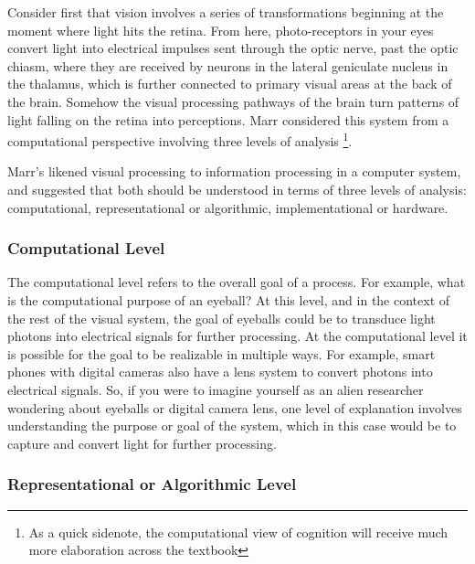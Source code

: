 \documentclass[
  oneside,
  12pt]{crumpbook}
\begin{document}
Consider first that vision involves a series of transformations beginning at the moment where light hits the retina. From here, photo-receptors in your eyes convert light into electrical impulses sent through the optic nerve, past the optic chiasm, where they are received by neurons in the lateral geniculate nucleus in the thalamus, which is further connected to primary visual areas at the back of the brain. Somehow the visual processing pathways of the brain turn patterns of light falling on the retina into perceptions. Marr considered this system from a computational perspective involving three levels of analysis \footnote{As a quick sidenote, the computational view of cognition will receive much more elaboration across the textbook}.

Marr's likened visual processing to information processing in a computer system, and suggested that both should be understood in terms of three levels of analysis: computational, representational or algorithmic, implementational or hardware.

\hypertarget{computational-level}{%
\subsubsection{Computational Level}\label{computational-level}}

The computational level refers to the overall goal of a process. For example, what is the computational purpose of an eyeball? At this level, and in the context of the rest of the visual system, the goal of eyeballs could be to transduce light photons into electrical signals for further processing. At the computational level it is possible for the goal to be realizable in multiple ways. For example, smart phones with digital cameras also have a lens system to convert photons into electrical signals. So, if you were to imagine yourself as an alien researcher wondering about eyeballs or digital camera lens, one level of explanation involves understanding the purpose or goal of the system, which in this case would be to capture and convert light for further processing.

\hypertarget{representational-or-algorithmic-level}{%
\subsubsection{Representational or Algorithmic Level}\label{representational-or-algorithmic-level}}
\end{document}
